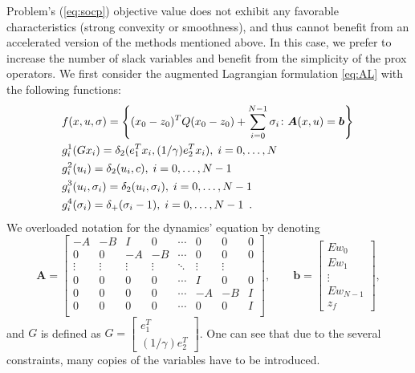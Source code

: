 \documentclass[openany]{now}
\begin{document}
Problem's (\ref{eq:socp}) objective value does not exhibit any favorable characteristics (strong convexity or smoothness), and thus cannot benefit from an accelerated version of the methods mentioned above. In this case, we prefer to increase the number of slack variables and benefit from the simplicity of the prox operators. We first consider the augmented Lagrangian formulation \ref{eq:AL} with the following functions:
\begin{align}
  &f(x,u,\sigma) = \left\{(x_0-z_0)^TQ(x_0-z_0) + \sum_{i=0}^{N-1} \sigma_i \colon \boldsymbol{A}(x,u)=\boldsymbol{b}\right\}{\label{soft_landing::step1}}\\
  &g_i^1(Gx_i) = \delta_2(e_1^Tx_i,(1/\gamma)e_2^Tx_i), \; i = 0,\ldots,N{\label{soft_landing::step2a}}\\
  &g_i^2(u_i) = \delta_2(u_i,c), \; i = 0,\ldots,N-1{\label{soft_landing::step2b}}\\
  &g_i^3(u_i,\sigma_i) = \delta_2(u_i,\sigma_i), \; i = 0,\ldots,N-1{\label{soft_landing::step2c}}\\ 
  &g_i^4(\sigma_i) = \delta_+(\sigma_i-1), \; i = 0,\ldots,N-1{\label{soft_landing::step2d}}\enspace.
\end{align}
We overloaded notation for the dynamics' equation by denoting 
\[
 \boldsymbol{A} = \left[\begin{array}{ccccccccc}
-A & -B & I & 0 & \cdots & 0 &0 & 0\\
0 & 0 & -A & -B & \cdots & 0 &0 & 0\\
\vdots & \vdots & \vdots & \vdots & \ddots & \vdots & \vdots\\
0 & 0 & 0 & 0 & \cdots & I & 0 & 0\\
0 & 0 & 0 & 0 & \cdots & -A & -B &I\\
0 & 0 & 0 & 0 & \cdots & 0 & 0 &I\\
\end{array} \right], \qquad \boldsymbol{b} =
\left[\begin{array}{c}Ew_0\\Ew_1\\\vdots\\Ew_{N-1}\\z_f \end{array}
\right],
\]
and $G$ is defined as $G=\left[\begin{array}{c} e_1^T\\(1/\gamma)e_2^T\end{array}\right]$. One can see that due to the several constraints, many copies of the variables have to be introduced.
\end{document}
